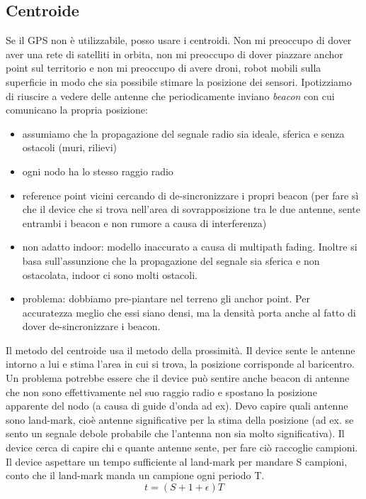 \documentclass[12pt,italian]{report}
\begin{document}
\subsection{Centroide}
Se il GPS non è utilizzabile, posso usare i centroidi. Non mi preoccupo di dover aver una rete di satelliti in orbita, non mi preoccupo di dover piazzare anchor point sul territorio e non mi preoccupo di avere droni, robot mobili sulla superficie in modo che sia possibile stimare la posizione dei sensori. 
\bigbreak
Ipotizziamo di riuscire a vedere delle antenne che periodicamente inviano \textit{beacon} con cui comunicano la propria posizione: 
\begin{itemize}
    \item assumiamo che la propagazione del segnale radio sia ideale, sferica e senza ostacoli (muri, rilievi)
    \item ogni nodo ha lo stesso raggio radio
    \item reference point vicini cercando di de-sincronizzare i propri beacon (per fare sì che il device che si trova nell'area di sovrapposizione tra le due antenne, sente entrambi i beacon e non rumore a causa di interferenza)
    \item non adatto indoor: modello inaccurato a causa di multipath fading. Inoltre si basa sull'assunzione che la propagazione del segnale sia sferica e non ostacolata, indoor ci sono molti ostacoli.
    \item problema: dobbiamo pre-piantare nel terreno gli anchor point. Per accuratezza meglio che essi siano densi, ma la densità porta anche al fatto di dover de-sincronizzare i beacon.
\end{itemize}
Il metodo del centroide usa il metodo della prossimità. Il device sente le antenne intorno a lui e stima l'area in cui si trova, la posizione corrisponde al baricentro. 
\bigbreak
Un problema potrebbe essere che il device può sentire anche beacon di antenne che non sono effettivamente nel suo raggio radio e spostano la posizione apparente del nodo (a causa di guide d'onda ad ex). Devo capire quali antenne sono land-mark, cioè antenne significative per la stima della posizione (ad ex. se sento un segnale debole probabile che l'antenna non sia molto significativa). 
\bigbreak Il device cerca di capire chi e quante antenne sente, per fare ciò raccoglie campioni. Il device aspettare un tempo sufficiente al land-mark per mandare S campioni, conto che il land-mark manda un campione ogni periodo T. 
\begin{equation}
    t = (S + 1 + \epsilon)T
\end{equation}
\end{document}
